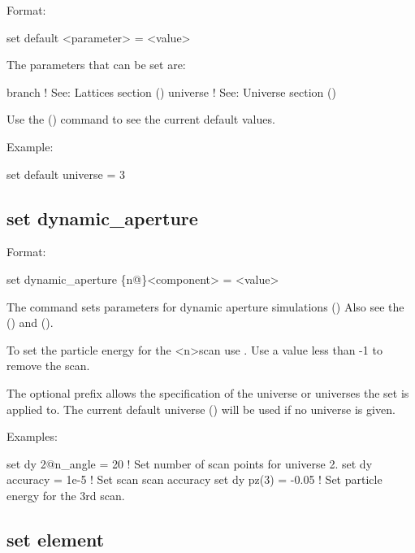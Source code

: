 {{Format:
\begin{example}
  set default <parameter> = <value>
\end{example}

The parameters that can be set are:
\begin{example}
  branch            ! See: Lattices section ()
  universe          ! See: Universe section ()
\end{example}

Use the  () command to see the current
default values.

Example:
\begin{example}
  set default universe = 3
\end{example}


\subsection{set dynamic_aperture}
\label{s:set.da}

Format:
\begin{example}
  set dynamic_aperture \{n@\}<component> = <value>
\end{example}

The  command sets parameters for dynamic aperture simulations
() Also see the  ()
and  ().

To set the particle energy for the <n>\Th scan use . Use a value less than -1 to remove the scan.

The optional  prefix allows the specification of the universe or universes the set is applied
to. The current default universe () will be used if no universe is given.

Examples:
\begin{example}
  set dy 2@n_angle = 20   ! Set number of scan points for universe 2.
  set dy accuracy = 1e-5  ! Set scan scan accuracy
  set dy pz(3) = -0.05    ! Set particle energy for the 3rd scan.
\end{example}


\subsection{set element}
\label{s:set.element}

}}
